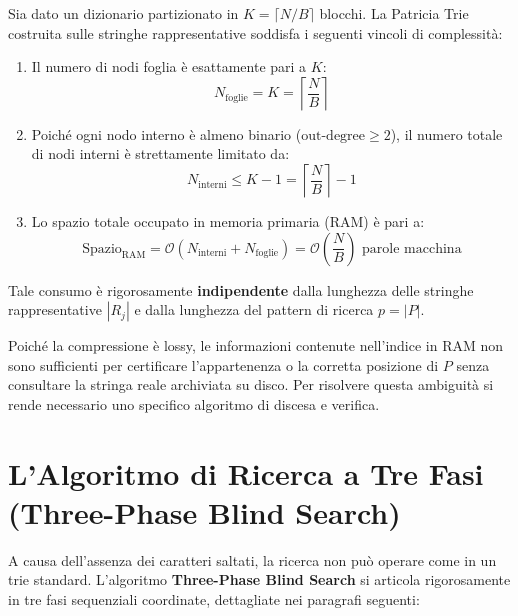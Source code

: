 \begin{theorem}
\label{thm:invarianza-spaziale-patricia}
Sia dato un dizionario partizionato in $K = \lceil N/B \rceil$ blocchi. La Patricia Trie costruita sulle stringhe rappresentative soddisfa i seguenti vincoli di complessit\`a:
\begin{enumerate}
  \item Il numero di nodi foglia \`e esattamente pari a $K$:
  \begin{equation}
    N_{\text{foglie}} = K = \left\lceil \frac{N}{B} \right\rceil
  \end{equation}
  \item Poich\'e ogni nodo interno \`e almeno binario ($\text{out-degree} \ge 2$), il numero totale di nodi interni \`e strettamente limitato da:
  \begin{equation}
    N_{\text{interni}} \le K - 1 = \left\lceil \frac{N}{B} \right\rceil - 1
  \end{equation}
  \item Lo spazio totale occupato in memoria primaria (RAM) \`e pari a:
  \begin{equation}
    \text{Spazio}_{\text{RAM}} = \mathcal{O}(N_{\text{interni}} + N_{\text{foglie}}) = \mathcal{O}\left( \frac{N}{B} \right) \text{ parole macchina}
  \end{equation}
\end{enumerate}
Tale consumo \`e rigorosamente \textbf{indipendente} dalla lunghezza delle stringhe rappresentative $|R_j|$ e dalla lunghezza del pattern di ricerca $p = |P|$.
\end{theorem}

Poich\'e la compressione \`e lossy, le informazioni contenute nell'indice in RAM non sono sufficienti per certificare l'appartenenza o la corretta posizione di $P$ senza consultare la stringa reale archiviata su disco. Per risolvere questa ambiguit\`a si rende necessario uno specifico algoritmo di discesa e verifica.

\FloatBarrier
\section{L'Algoritmo di Ricerca a Tre Fasi (Three-Phase Blind Search)}
\label{sec:three-phase-blind-search}

A causa dell'assenza dei caratteri saltati, la ricerca non pu\`o operare come in un trie standard. L'algoritmo \textbf{Three-Phase Blind Search} si articola rigorosamente in tre fasi sequenziali coordinate, dettagliate nei paragrafi seguenti:

